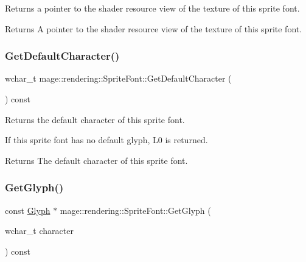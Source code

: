 Returns a pointer to the shader resource view of the texture of this sprite font.

\begin{DoxyReturn}{Returns}
A pointer to the shader resource view of the texture of this sprite font. 
\end{DoxyReturn}
\hypertarget{classmage_1_1rendering_1_1_sprite_font_af50e0ef59bf9d4be7b402c71609de497}{}\label{classmage_1_1rendering_1_1_sprite_font_af50e0ef59bf9d4be7b402c71609de497} 
\subsubsection{\texorpdfstring{Get\+Default\+Character()}{GetDefaultCharacter()}}
{\footnotesize\ttfamily wchar\+\_\+t mage\+::rendering\+::\+Sprite\+Font\+::\+Get\+Default\+Character (\begin{DoxyParamCaption}{ }\end{DoxyParamCaption}) const\hspace{0.3cm}{\ttfamily [noexcept]}}

Returns the default character of this sprite font.

If this sprite font has no default glyph, {\ttfamily L\textquotesingle{}0\textquotesingle{}} is returned.

\begin{DoxyReturn}{Returns}
The default character of this sprite font. 
\end{DoxyReturn}
\hypertarget{classmage_1_1rendering_1_1_sprite_font_aa56b305252b14f6ecf51738fccb16e93}{}\label{classmage_1_1rendering_1_1_sprite_font_aa56b305252b14f6ecf51738fccb16e93} 
\subsubsection{\texorpdfstring{Get\+Glyph()}{GetGlyph()}}
{\footnotesize\ttfamily const \hyperlink{structmage_1_1rendering_1_1_glyph}{Glyph} $\ast$ mage\+::rendering\+::\+Sprite\+Font\+::\+Get\+Glyph (\begin{DoxyParamCaption}\item[{wchar\+\_\+t}]{character }\end{DoxyParamCaption}) const}

